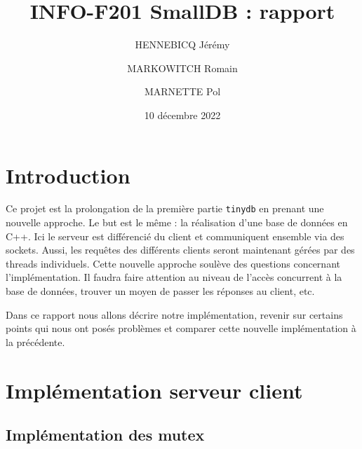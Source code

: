 \documentclass[utf8]{article}
\title{INFO-F201 SmallDB : rapport}
\author{HENNEBICQ Jérémy\and MARKOWITCH Romain \and MARNETTE Pol}
\date{10 décembre 2022}
\begin{document}
\maketitle
\tableofcontents

\newpage


\section{Introduction}

Ce projet est la prolongation de la première partie \texttt{tinydb} en prenant une nouvelle approche. Le but est le même : la réalisation d'une base de données en C++. Ici le serveur est différencié du client et communiquent ensemble via des sockets. Aussi, les requêtes des différents clients seront maintenant gérées par des threads individuels. Cette nouvelle approche soulève des questions concernant l'implémentation. Il faudra faire attention au niveau de l'accès concurrent à la base de données, trouver un moyen de passer les réponses au client, etc.

Dans ce rapport nous allons décrire notre implémentation, revenir sur certains points qui nous ont posés problèmes et comparer cette nouvelle implémentation à la précédente.

\section{Implémentation serveur client}

\subsection{Implémentation des mutex}
\end{document}

